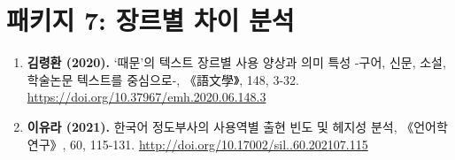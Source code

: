 \documentclass[twoside,openright]{report}
\newcommand{\da}[1]{{\small{《#1》}}}
\newcommand{\sq}[1]{‘#1'}
\begin{document}
\section*{패키지 7: 장르별 차이 분석}

\begin{enumerate}[label=\textbf{\arabic*.}] %

  \item \textbf{김령환 (2020).} \sq{때문}의 텍스트 장르별 사용 양상과 의미 특성 -구어, 신문, 소설, 학술논문 텍스트를 중심으로-, \da{語文學}, 148, 3-32. \href{https://doi.org/10.37967/emh.2020.06.148.3}{https://doi.org/10.37967/emh.2020.06.148.3}
  
        
  \item \textbf{이유라 (2021).} 한국어 정도부사의 사용역별 출현 빈도 및 헤지성 분석, \da{언어학 연구}, 60, 115-131. \href{http://doi.org/10.17002/sil..60.202107.115}{http://doi.org/10.17002/sil..60.202107.115}
  

\end{enumerate}
\end{document}
